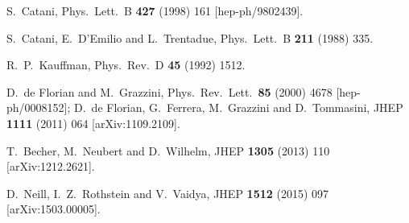 \documentclass[12pt]{article}
\begin{document}
\begin{thebibliography}{99}
  S.~Catani,
  Phys.\ Lett.\ B {\bf 427} (1998) 161
  [hep-ph/9802439].



  
  S.~Catani, E.~D'Emilio and L.~Trentadue,
  Phys.\ Lett.\ B {\bf 211} (1988) 335.

  R.~P.~Kauffman,
  Phys.\ Rev.\ D {\bf 45} (1992) 1512.

  D.~de Florian and M.~Grazzini,
  Phys.\ Rev.\ Lett.\  {\bf 85} (2000) 4678
  [hep-ph/0008152];
    D.~de Florian, G.~Ferrera, M.~Grazzini and D.~Tommasini,
  JHEP {\bf 1111} (2011) 064
  [arXiv:1109.2109].

  
  T.~Becher, M.~Neubert and D.~Wilhelm,
  JHEP {\bf 1305} (2013) 110
  [arXiv:1212.2621].

  D.~Neill, I.~Z.~Rothstein and V.~Vaidya,
  JHEP {\bf 1512} (2015) 097
  [arXiv:1503.00005].


\end{thebibliography}
\end{document}
